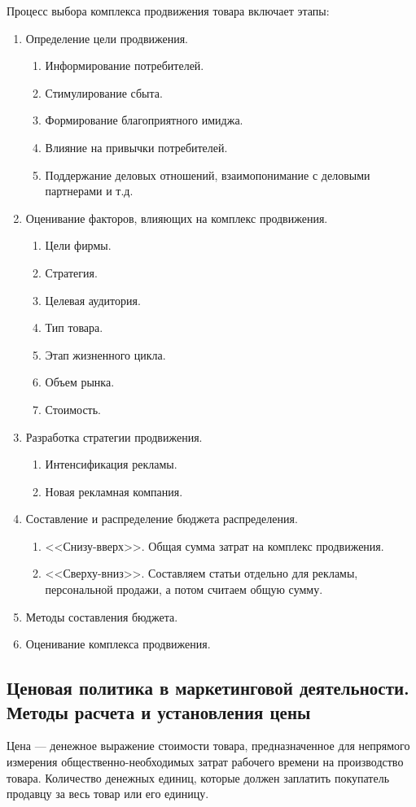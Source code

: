 \documentclass[a4paper,12pt,oneside,final]{extarticle}
\numberwithin{equation}{section}
\begin{document}
Процесс выбора комплекса продвижения товара включает этапы:
\begin{enumerate}
	\item Определение цели продвижения. 	
	\begin{enumerate}
		\item Информирование потребителей.
		\item Стимулирование сбыта.
		\item Формирование благоприятного имиджа.
		\item Влияние на привычки потребителей.
		\item Поддержание деловых отношений, взаимопонимание с деловыми партнерами и т.д.
	\end{enumerate}
	\item Оценивание факторов, влияющих на комплекс продвижения.		
	\begin{enumerate}
		\item Цели фирмы.
		\item Стратегия.
		\item Целевая аудитория.
		\item Тип товара.
		\item Этап жизненного цикла.
		\item Объем рынка.
		\item Стоимость.
	\end{enumerate}
	\item Разработка стратегии продвижения.	
	\begin{enumerate}
		\item Интенсификация рекламы.
		\item Новая рекламная компания.
	\end{enumerate}
	\item Составление и распределение бюджета распределения.	
	\begin{enumerate}
		\item <<Снизу-вверх>>. Общая сумма затрат на комплекс продвижения.
		\item <<Сверху-вниз>>. Составляем статьи отдельно для рекламы, персональной продажи, а потом считаем общую сумму.
	\end{enumerate}
	\item Методы составления бюджета.	
	\item Оценивание комплекса продвижения.	
\end{enumerate}

\subsection{Ценовая политика в маркетинговой деятельности. Методы расчета и установления цены}
Цена --- денежное выражение стоимости товара, предназначенное для непрямого измерения общественно-необходимых затрат рабочего времени на производство товара. Количество денежных единиц, которые должен заплатить покупатель продавцу за весь товар или его единицу.
\end{document}
